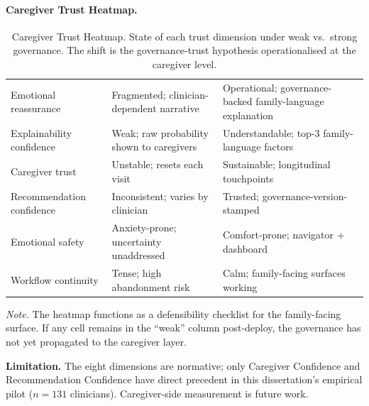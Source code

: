 \paragraph{Caregiver Trust Heatmap.}




{\tablestripes\tablefontsize
{}
\begin{xltabular}{\textwidth}{@{} >{\raggedright\arraybackslash}p{3.6cm} L L @{}}
\caption[Caregiver Trust Heatmap]{Caregiver Trust Heatmap. State of each trust dimension under weak vs.\ strong governance. The shift is the governance-trust hypothesis operationalised at the caregiver level.}\label{tab:appk_caregiver_heatmap} \\
\toprule
{} &  &  \\
\midrule
\endfirsthead
\endhead
\bottomrule
\endlastfoot
Emotional reassurance       & Fragmented; clinician-dependent narrative & Operational; governance-backed family-language explanation \\
Explainability confidence    & Weak; raw probability shown to caregivers & Understandable; top-3 family-language factors \\
Caregiver trust              & Unstable; resets each visit                & Sustainable; longitudinal touchpoints \\
Recommendation confidence    & Inconsistent; varies by clinician          & Trusted; governance-version-stamped \\
Emotional safety             & Anxiety-prone; uncertainty unaddressed     & Comfort-prone; navigator + dashboard \\
Workflow continuity          & Tense; high abandonment risk               & Calm; family-facing surfaces working \\
\end{xltabular}}
\vspace{0.4em}
\noindent\textit{Note.} The heatmap functions as a defensibility checklist for the family-facing surface. If any cell remains in the ``weak'' column post-deploy, the governance has not yet propagated to the caregiver layer.

\noindent\textbf{Limitation.} The eight dimensions are normative; only Caregiver Confidence and Recommendation Confidence have direct precedent in this dissertation's empirical pilot ($n=131$ clinicians). Caregiver-side measurement is future work.


